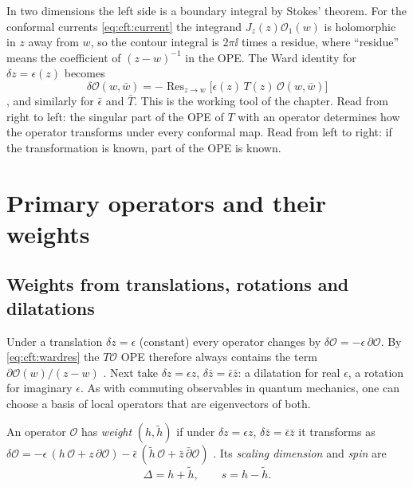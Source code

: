 In two dimensions the left side is a boundary integral by Stokes' theorem. For the conformal
currents \eqref{eq:cft:current} the integrand $J_z(z)\mathcal O_1(w)$ is holomorphic in $z$ away
from $w$, so the contour integral is $2\pi\ii$ times a residue, where ``residue'' means the
coefficient of $(z-w)^{-1}$ in the OPE. The Ward identity for $\delta z=\epsilon(z)$ becomes
\begin{equation}\label{eq:cft:wardres}
  \delta\mathcal O(w,\bar w)=-\operatorname{Res}_{z\to w}\big[\epsilon(z)\,T(z)\,
   \mathcal O(w,\bar w)\big]
\end{equation}
, and similarly for $\bar\epsilon$ and $\bar T$. This is the
working tool of the chapter. Read from right to left: the singular part of the OPE of $T$ with an
operator determines how the operator transforms under every conformal map. Read from left to
right: if the transformation is known, part of the OPE is known.

\section{Primary operators and their weights}\label{sec:cft:primary}

\subsection{Weights from translations, rotations and dilatations}

Under a translation $\delta z=\epsilon$ (constant) every operator changes by
$\delta\mathcal O=-\epsilon\,\partial\mathcal O$. By \eqref{eq:cft:wardres} the $T\mathcal O$
OPE therefore always contains the term $\partial\mathcal O(w)/(z-w)$
. Next take $\delta z=\epsilon z$,
$\delta\bar z=\bar\epsilon\bar z$: a dilatation for real $\epsilon$, a rotation for imaginary
$\epsilon$. As with commuting observables in quantum mechanics, one can choose a basis of local
operators that are eigenvectors of both.

\begin{definition}\label{def:cft:weight}
An operator $\mathcal O$ has \emph{weight} $(h,\tilde h)$ if under
$\delta z=\epsilon z$, $\delta\bar z=\bar\epsilon\bar z$ it transforms as
$\delta\mathcal O=-\epsilon\,(h\,\mathcal O+z\,\partial\mathcal O)
 -\bar\epsilon\,(\tilde h\,\mathcal O+\bar z\,\bar\partial\mathcal O)$
. Its \emph{scaling dimension} and
\emph{spin} are
\begin{equation}\label{eq:cft:dimspin}
  \Delta=h+\tilde h,\qquad s=h-\tilde h .
\end{equation}
\end{definition}

